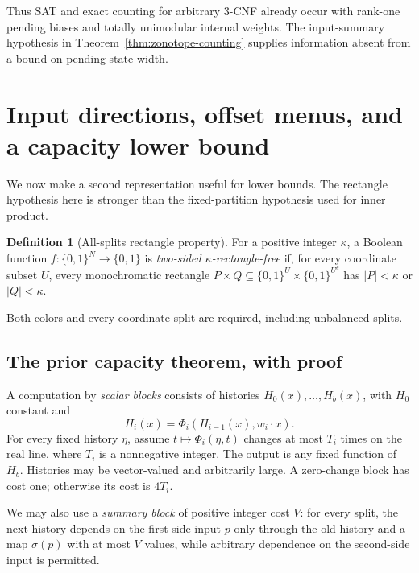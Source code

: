 \documentclass[11pt]{article}
\theoremstyle{definition}
\newtheorem{definition}[theorem]{Definition}
\newcommand{\bits}{\{0,1\}}
\begin{document}
Thus SAT and exact counting for arbitrary 3-CNF already occur with
rank-one pending biases and totally unimodular internal weights. The
input-summary hypothesis in Theorem~\ref{thm:zonotope-counting} supplies
information absent from a bound on pending-state width.



\section{Input directions, offset menus, and a capacity lower bound}\label{sec:capacity}
We now make a second representation useful for lower bounds. The rectangle hypothesis here is stronger than the fixed-partition hypothesis used for inner product.

\begin{definition}[All-splits rectangle property]
For a positive integer \(\kappa\), a Boolean function \(f:\bits^N\to\bits\) is \emph{two-sided \(\kappa\)-rectangle-free} if, for every coordinate subset \(U\), every monochromatic rectangle
\(P\times Q\subseteq\bits^U\times\bits^{U^c}\) has \(|P|<\kappa\) or \(|Q|<\kappa\).
\end{definition}
Both colors and every coordinate split are required, including unbalanced splits.

\subsection{The prior capacity theorem, with proof}
A computation by \emph{scalar blocks} consists of histories \(H_0(x),\ldots,H_b(x)\), with \(H_0\) constant and
\[
 H_i(x)=\Phi_i(H_{i-1}(x),w_i\cdot x).
\]
For every fixed history \(\eta\), assume \(t\mapsto\Phi_i(\eta,t)\) changes at most \(T_i\) times on the real line, where \(T_i\) is a nonnegative integer. The output is any fixed function of \(H_b\). Histories may be vector-valued and arbitrarily large. A zero-change block has cost one; otherwise its cost is \(4T_i\).

We may also use a \emph{summary block} of positive integer cost \(V\): for every split, the next history depends on the first-side input \(p\) only through the old history and a map \(\sigma(p)\) with at most \(V\) values, while arbitrary dependence on the second-side input is permitted.
\end{document}
